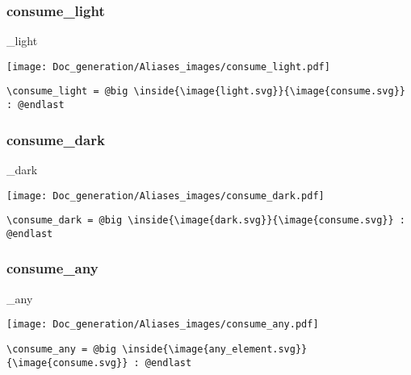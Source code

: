\documentclass{article}
\begin{document}
\subsubsection{consume\_light}
\begin{minipage}{0.45\linewidth}
\raggedright
\begin{spverbatim}
\consume_light
\end{spverbatim}
\end{minipage}
\begin{minipage}{0.45\linewidth}
\raggedleft
\texttt{[image: Doc\_generation/Aliases\_images/consume\_light.pdf]}
\end{minipage}
\begin{center}
\begin{BVerbatim}
\consume_light = @big \inside{\image{light.svg}}{\image{consume.svg}} : @endlast
\end{BVerbatim}
\end{center}

\subsubsection{consume\_dark}
\begin{minipage}{0.45\linewidth}
\raggedright
\begin{spverbatim}
\consume_dark
\end{spverbatim}
\end{minipage}
\begin{minipage}{0.45\linewidth}
\raggedleft
\texttt{[image: Doc\_generation/Aliases\_images/consume\_dark.pdf]}
\end{minipage}
\begin{center}
\begin{BVerbatim}
\consume_dark = @big \inside{\image{dark.svg}}{\image{consume.svg}} : @endlast
\end{BVerbatim}
\end{center}

\subsubsection{consume\_any}
\begin{minipage}{0.45\linewidth}
\raggedright
\begin{spverbatim}
\consume_any
\end{spverbatim}
\end{minipage}
\begin{minipage}{0.45\linewidth}
\raggedleft
\texttt{[image: Doc\_generation/Aliases\_images/consume\_any.pdf]}
\end{minipage}
\begin{center}
\begin{BVerbatim}
\consume_any = @big \inside{\image{any_element.svg}}{\image{consume.svg}} : @endlast
\end{BVerbatim}
\end{center}
\end{document}
